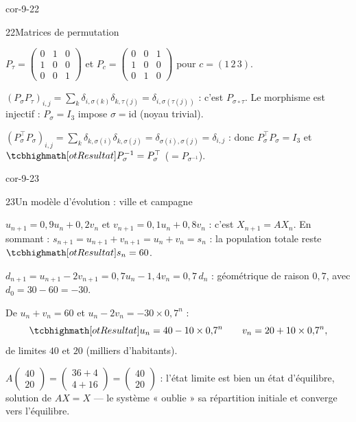 \begin{blocLivre}{cor-9-22}
\begin{corrige}{22}{Matrices de permutation}
\begin{questions}
  \item $P_\tau=\begin{pmatrix}0&1&0\\1&0&0\\0&0&1\end{pmatrix}$ et
    $P_c=\begin{pmatrix}0&0&1\\1&0&0\\0&1&0\end{pmatrix}$ pour
    $c=(1\,2\,3)$.
  \item $(P_\sigma P_\tau)_{i,j}=\sum_k\delta_{i,\sigma(k)}\delta_{k,\tau(j)}
    =\delta_{i,\sigma(\tau(j))}$ : c'est $P_{\sigma\circ\tau}$. Le
    morphisme est injectif : $P_\sigma=I_3$ impose $\sigma=\mathrm{id}$
    (noyau trivial).
  \item $(P_\sigma^{\top}P_\sigma)_{i,j}=\sum_k\delta_{k,\sigma(i)}
    \delta_{k,\sigma(j)}=\delta_{\sigma(i),\sigma(j)}=\delta_{i,j}$ :
    donc $P_\sigma^{\top}P_\sigma=I_3$ et
    $\res{P_\sigma^{-1}=P_\sigma^{\top}}$ ($=P_{\sigma^{-1}}$).
\end{questions}
\end{corrige}
\end{blocLivre}

\begin{blocLivre}{cor-9-23}
\begin{corrige}{23}{Un modèle d'évolution : ville et campagne}
\begin{questions}
  \item $u_{n+1}=0{,}9u_n+0{,}2v_n$ et $v_{n+1}=0{,}1u_n+0{,}8v_n$ :
    c'est $X_{n+1}=AX_n$. En sommant :
    $s_{n+1}=u_{n+1}+v_{n+1}=u_n+v_n=s_n$ : la population totale reste
    $\res{s_n=60}$.
  \item $d_{n+1}=u_{n+1}-2v_{n+1}=0{,}7u_n-1{,}4v_n=0{,}7\,d_n$ :
    géométrique de raison $0{,}7$, avec $d_0=30-60=-30$.
  \item De $u_n+v_n=60$ et $u_n-2v_n=-30\times0{,}7^{n}$ :
    \[
      \res{u_n=40-10\times0{,}7^{n}\qquad v_n=20+10\times0{,}7^{n}},
    \]
    de limites $40$ et $20$ (milliers d'habitants).
  \item $A\begin{pmatrix}40\\20\end{pmatrix}
    =\begin{pmatrix}36+4\\4+16\end{pmatrix}
    =\begin{pmatrix}40\\20\end{pmatrix}$ : l'état limite est bien un
    état d'équilibre, solution de $AX=X$ — le système « oublie » sa
    répartition initiale et converge vers l'équilibre.
\end{questions}
\end{corrige}
\end{blocLivre}

